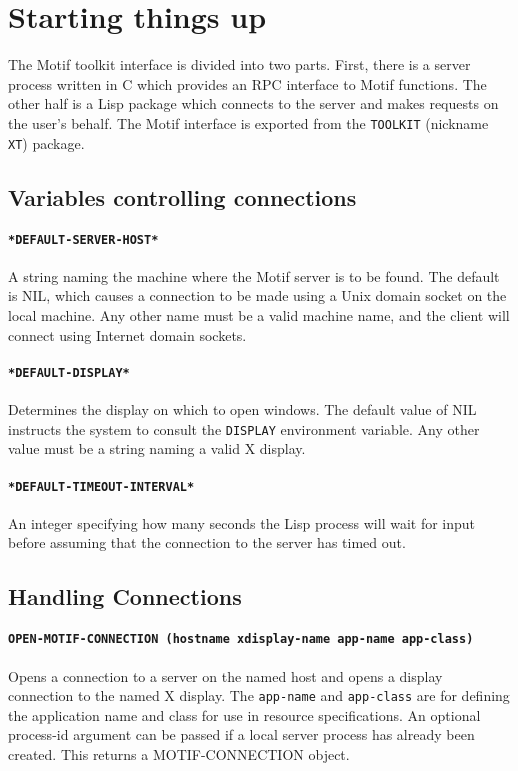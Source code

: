 \documentclass[a4paper]{article}
\begin{document}
\section{Starting things up}

The Motif toolkit interface is divided into two parts.  First, there is
a server process written in C which provides an RPC interface to Motif
functions.  The other half is a Lisp package which connects to the server
and makes requests on the user's behalf.  The Motif interface is exported
from the \texttt{TOOLKIT} (nickname \texttt{XT}) package.


\subsection{Variables controlling connections}

\paragraph{\texttt{*DEFAULT-SERVER-HOST*}} A string naming the machine
where the Motif server is to be found.  The default is NIL, which
causes a connection to be made using a Unix domain socket on the local
machine.  Any other name must be a valid machine name, and the client
will connect using Internet domain sockets.

\paragraph{\texttt{*DEFAULT-DISPLAY*}} Determines the display on which
to open windows. The default value of NIL instructs the system to
consult the \texttt{DISPLAY} environment variable.  Any other value
must be a string naming a valid X display.

\paragraph{\texttt{*DEFAULT-TIMEOUT-INTERVAL*}} An integer specifying
how many seconds the Lisp process will wait for input before assuming
that the connection to the server has timed out.


\subsection{Handling Connections}

\paragraph{\texttt{OPEN-MOTIF-CONNECTION (hostname xdisplay-name
app-name app-class)}} Opens a connection to a server on the named host
and opens a display connection to the named X display.  The
\texttt{app-name} and \texttt{app-class} are for defining the
application name and class for use in resource specifications.  An
optional process-id argument can be passed if a local server process
has already been created.  This returns a MOTIF-CONNECTION object.
\end{document}
